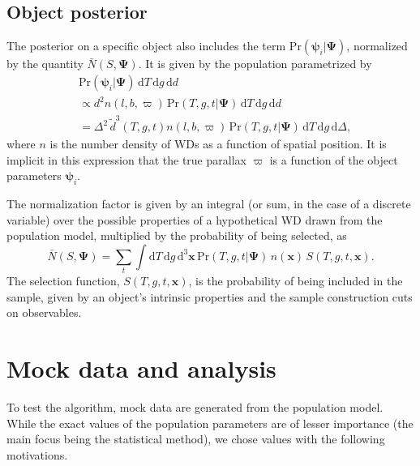 \documentclass[fleqn,usenatbib]{mnras}
\newcommand{\popp}{\boldsymbol{\Psi}}
\newcommand{\objp}{\boldsymbol{\psi}}
\newcommand{\Teff}{T}
\newcommand{\logg}{g}
\newcommand{\pr}{\text{Pr}}
\newcommand{\de}{\text{d}}
\begin{document}
\subsection{Object posterior}\label{sec:objectposterior}

The posterior on a specific object also includes the term $\pr(\objp_i | \popp)$, normalized by the quantity $\bar{N}(S,\popp)$. It is given by the population parametrized by
\begin{equation}
\begin{split}
	& \pr(\objp_i | \popp)\, \de \Teff\, \de \logg\, \de d  \\ & \propto
    d^2 n(l,b,\varpi)\, \pr(\Teff,g,t | \popp)\, \de \Teff\, \de \logg\, \de d \\
    & = \Delta^2\, \tilde{d}^3(\Teff,\logg,t) n(l,b,\varpi)\, \pr(\Teff,g,t | \popp)\, \de \Teff\, \de\logg\, \de \Delta,
\end{split}
\end{equation}
where $n$ is the number density of WDs as a function of spatial position. It is implicit in this expression that the true parallax $\varpi$ is a function of the object parameters $\objp_i$.

The normalization factor is given by an integral (or sum, in the case of a discrete variable) over the possible properties of a hypothetical WD drawn from the population model, multiplied by the probability of being selected, as
\begin{equation}\label{eq:normalization}
	\bar{N}(S,\popp) = \sum_{t} \int \de\Teff\, \de \logg\, \de^3\mathbf{x}\,
    \pr(\Teff,g,t | \popp)\, n(\mathbf{x})\, S(\Teff,\logg,t,\mathbf{x}).
\end{equation}
The selection function, $S(\Teff,\logg,t,\mathbf{x})$, is the probability of being included in the sample, given by an object's intrinsic properties and the sample construction cuts on observables.







\section{Mock data and analysis}\label{sec:mock}

To test the algorithm, mock data are generated from the population model. While the exact values of the population parameters are of lesser importance (the main focus being the statistical method), we chose values with the following motivations.
\end{document}
